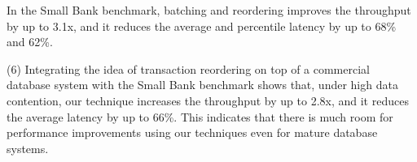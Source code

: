  In the Small Bank benchmark, batching and reordering improves the throughput by up to 3.1x, and it reduces the average and percentile latency by up to 68\% and 62\%.


(6) Integrating the idea of transaction reordering on top of a commercial database system with the Small Bank benchmark shows that, under high data contention, our technique increases the throughput by up to 2.8x, and it reduces the average latency by up to 66\%. This indicates that there is much room for performance improvements using our techniques even for mature database systems.
